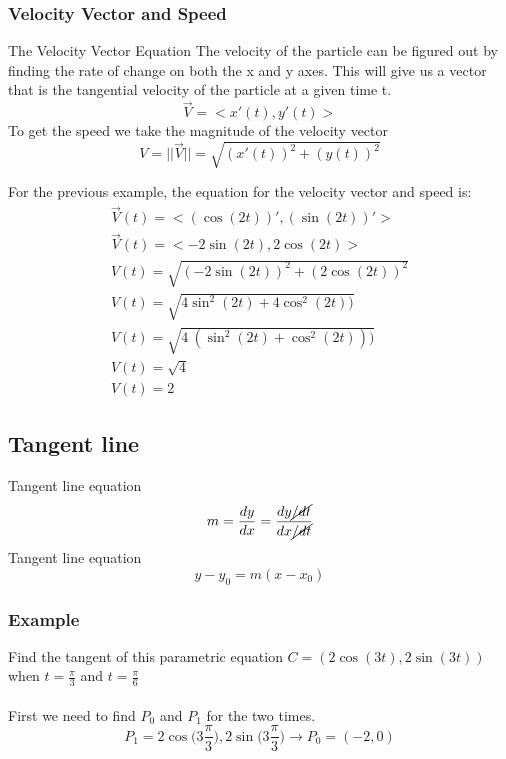 \documentclass[./MATH-115-Notes.tex]{subfiles}
\begin{document}
\subsubsection{Velocity Vector and Speed}
\begin{paperbox}{The Velocity Vector Equation}
    The velocity of the particle can be figured out by finding the rate of change on both the x and y axes. This will give us a vector that is the tangential velocity of the particle at a given time t.
    \begin{equation}
        \vec{V} = < x'(t), y'(t) >
    \end{equation}
    To get the speed we take the magnitude of the velocity vector
    \begin{equation}
        V = || \vec{V} || = \sqrt{ (x'(t))^2 + (y(t))^2 }
    \end{equation} 
\end{paperbox}
For the previous example, the equation for the velocity vector and speed is:
\begin{gather*}
    \vec{V}(t) = <(\cos(2t))', (\sin(2t))'>\\
    \vec{V}(t) = <-2\sin(2t), 2\cos(2t)>\\
    V(t) = \sqrt{(-2\sin(2t))^2 + (2\cos(2t))^2}\\
    V(t) = \sqrt{4\sin^2(2t) + 4\cos^2(2t))}\\
    V(t) = \sqrt{4\ (\sin^2(2t) + \cos^2(2t)))}\\
    V(t) = \sqrt{4}\\ 
    V(t) = 2
\end{gather*} 
\newpage   
\subsection{Tangent line}
\begin{paperbox}{Tangent line equation}
    \begin{equation}
        m = \frac{dy}{dx} = \frac{dy\cancel{/dt}}{dx\cancel{/dt}}
    \end{equation}
    Tangent line equation
    \begin{equation}
        y - y_0 = m(x - x_0)
    \end{equation}
\end{paperbox}
\subsubsection{Example}
Find the tangent of this parametric equation $ C = (2\cos(3t), 2\sin(3t)) $ when $t = \frac{\pi}{3}$ and $t = \frac{\pi}{6}$
\\~\\
First we need to find $P_0$ and $P_1$ for the two times.
$$
    P_1 = 2\cos\biggl(3\frac{\pi}{3}\biggl), 2\sin\biggl(3\frac{\pi}{3}\biggl) \rightarrow P_0 = (-2,0)
$$
\end{document}
